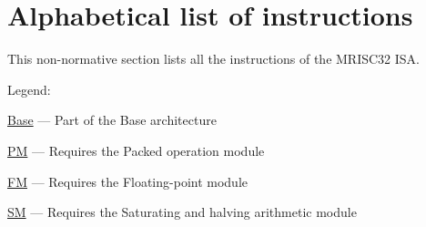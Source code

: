 %

\onecolumn

\chapter{Alphabetical list of instructions}

This non-normative section lists all the instructions of the MRISC32 ISA.

Legend:
\begin{bulletitems}
  \item{\hyperref[module:Base]{Base} --- Part of the Base architecture}
  \item{\hyperref[module:PM]{PM} --- Requires the Packed operation module}
  \item{\hyperref[module:FM]{FM} --- Requires the Floating-point module}
  \item{\hyperref[module:SM]{SM} --- Requires the Saturating and halving arithmetic module}
\end{bulletitems}



\twocolumn
